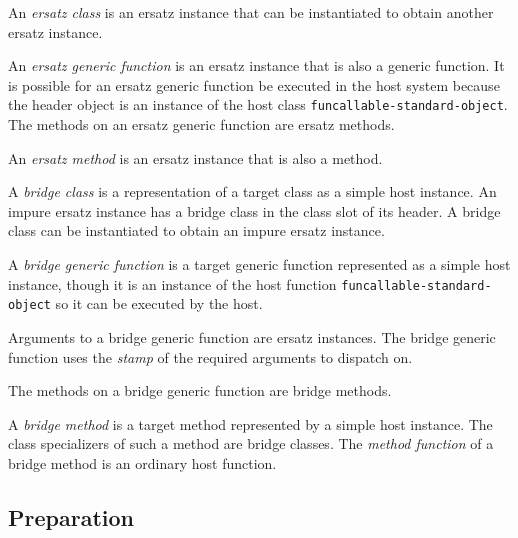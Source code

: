 \begin{definition}
An \emph{ersatz class} is an ersatz instance that can be instantiated
to obtain another ersatz instance.
\end{definition}

\begin{definition}
An \emph{ersatz generic function} is an ersatz instance that is also a
generic function.  It is possible for an ersatz generic function be
executed in the host system because the header object is an instance
of the host class \texttt{funcallable-standard-object}.  The methods
on an ersatz generic function are ersatz methods.
\end{definition}

\begin{definition}
An \emph{ersatz method} is an ersatz instance that is also a method.
\end{definition}

\begin{definition}
A \emph{bridge class} is a representation of a target class as a
simple host instance.  An impure ersatz instance has a bridge class in
the class slot of its header.  A bridge class can be instantiated to
obtain an impure ersatz instance.
\end{definition}

\begin{definition}
A \emph{bridge generic function} is a target generic function
represented as a simple host instance, though it is an instance of the
host function \texttt{funcallable-standard-object} so it can be
executed by the host.

Arguments to a bridge generic function are ersatz instances.  The
bridge generic function uses the
\emph{stamp}
 of
the required arguments to dispatch on.

The methods on a bridge generic function are bridge methods.
\end{definition}

\begin{definition}
A \emph{bridge method} is a target method represented by a simple host
instance.  The class specializers of such a method are bridge classes.
The \emph{method function} of a bridge method is an ordinary host
function.
\end{definition}

\subsection{Preparation}

